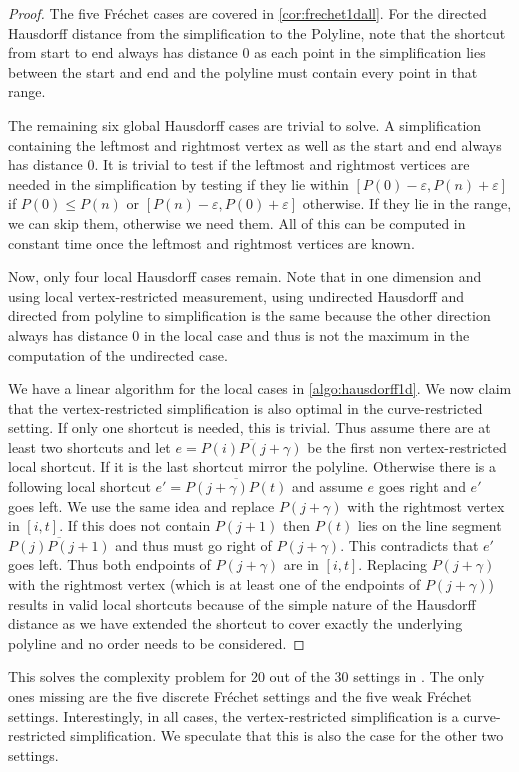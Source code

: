 \begin{proof}
	The five Fréchet cases are covered in \cref{cor:frechet1dall}. For the directed Hausdorff distance from the simplification to the Polyline, note that the shortcut from start to end always has distance 0 as each point in the simplification lies between the start and end and the polyline must contain every point in that range. 

	The remaining six global Hausdorff cases are trivial to solve. A simplification containing the leftmost and rightmost vertex as well as the start and end always has distance 0. It is trivial to test if the leftmost and rightmost vertices are needed in the simplification by testing if they lie within \([P(0) - \varepsilon, P(n) + \varepsilon]\) if \(P(0) \leq P(n)\) or \([P(n) - \varepsilon, P(0) + \varepsilon]\) otherwise. If they lie in the range, we can skip them, otherwise we need them. All of this can be computed in constant time once the leftmost and rightmost vertices are known.

	Now, only four local Hausdorff cases remain. Note that in one dimension and using local vertex-restricted measurement, using undirected Hausdorff and directed from polyline to simplification is the same because the other direction always has distance 0 in the local case and thus is not the maximum in the computation of the undirected case. 

	We have a linear algorithm for the local cases in \cref{algo:hausdorff1d}. We now claim that the vertex-restricted simplification is also optimal in the curve-restricted setting. If only one shortcut is needed, this is trivial. Thus assume there are at least two shortcuts and let \(e = \overline{P(i)P(j+\gamma)}\) be the first non vertex-restricted local shortcut. If it is the last shortcut mirror the polyline. Otherwise there is a following local shortcut \(e' = \overline{P(j+\gamma)P(t)}\) and assume \(e\) goes right and \(e'\) goes left. We use the same idea and replace \(P(j+\gamma)\) with the rightmost vertex in \([i, t]\). If this does not contain \(P(j+1)\) then \(P(t)\) lies on the line segment \(\overline{P(j)P(j+1)}\) and thus must go right of \(P(j+\gamma)\). This contradicts that \(e'\) goes left. Thus both endpoints of \(P(j+\gamma)\) are in \([i, t]\). Replacing \(P(j+\gamma)\) with the rightmost vertex (which is at least one of the endpoints of \(P(j+\gamma)\)) results in valid local shortcuts because of the simple nature of the Hausdorff distance as we have extended the shortcut to cover exactly the underlying polyline and no order needs to be considered.
\end{proof}

This solves the complexity problem for 20 out of the 30 settings in \citeauthor{global_curve_simplification}. The only ones missing are the five discrete Fréchet settings and the five weak Fréchet settings. Interestingly, in all cases, the vertex-restricted simplification is a curve-restricted simplification. We speculate that this is also the case for the other two settings.
